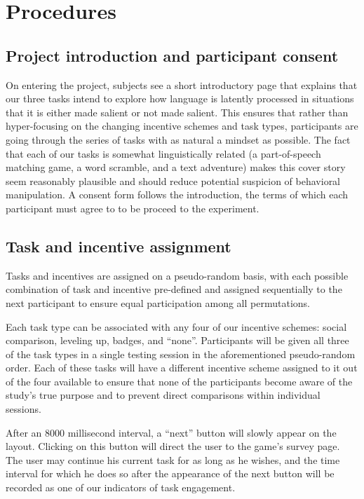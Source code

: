 \section{Procedures}

\subsection{Project introduction and participant consent}
On entering the project, subjects see a short introductory page that explains that our three tasks intend to explore how language is latently processed in situations that it is either made salient or not made salient. This ensures that rather than hyper-focusing on the changing incentive schemes and task types, participants are going through the series of tasks with as natural a mindset as possible. The fact that each of our tasks is somewhat linguistically related (a part-of-speech matching game, a word scramble, and a text adventure) makes this cover story seem reasonably plausible and should reduce potential suspicion of behavioral manipulation. A consent form follows the introduction, the terms of which each participant must agree to to be proceed to the experiment.

\subsection{Task and incentive assignment}
Tasks and incentives are assigned on a pseudo-random basis, with each possible combination of task and incentive pre-defined and assigned sequentially to the next participant to ensure equal participation among all permutations.

Each task type can be associated with any four of our incentive schemes: social comparison, leveling up, badges, and “none”. Participants will be given all three of the task types in a single testing session in the aforementioned pseudo-random order. Each of these tasks will have a different incentive scheme assigned to it out of the four available to ensure that none of the participants become aware of the study’s true purpose and to prevent direct comparisons within individual sessions.

After an 8000 millisecond interval, a “next” button will slowly appear on the layout. Clicking on this button will direct the user to the game’s survey page. The user may continue his current task for as long as he wishes, and the time interval for which he does so after the appearance of the next button will be recorded as one of our indicators of task engagement. 

